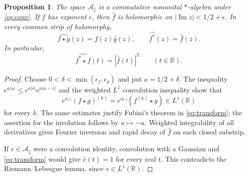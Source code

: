 \documentclass[11pt]{article}
\newtheorem{proposition}[theorem]{Proposition}
\theoremstyle{definition}
\theoremstyle{remark}
\numberwithin{equation}{section}
\newcommand{\cA}{\mathcal A}
\newcommand{\R}{\mathbb R}
\begin{document}
\begin{proposition}
The space $\cA_\zeta$ is a commutative nonunital $*$-algebra under
\eqref{eq:conv}.  If $f$ has exponent $\epsilon$, then $\widehat f$ is
holomorphic on $|\operatorname{Im}z|<1/2+\epsilon$.  In every common
strip of holomorphy,
\begin{equation}
 \widehat{f\star g}(z)=\widehat f(z)\widehat g(z),
 \qquad
 \widehat{f^*}(z)=\overline{\widehat f(\overline z)}.
 \label{eq:transform}
\end{equation}
In particular,
\begin{equation}
 \widehat{f^*\star f}(t)=|\widehat f(t)|^2
 \qquad(t\in\R).
 \label{eq:square-transform}
\end{equation}
\end{proposition}

\begin{proof}
Choose $0<\delta<\min(\epsilon_f,\epsilon_g)$ and put
$a=1/2+\delta$.  The inequality
$e^{a|u|}\leq e^{a|v|}e^{a|u-v|}$ and the weighted $L^1$ convolution
inequality show that
\[
 e^{a|\cdot|}(f\star g)^{(k)}
 =e^{a|\cdot|}(f^{(k)}\star g)\in L^1(\R)
\]
for every $k$.  The same estimates justify Fubini's theorem in
\eqref{eq:transform}; the assertion for the involution follows by
$u\mapsto-u$.  Weighted integrability of all derivatives gives Fourier
inversion and rapid decay of $\widehat f$ on each closed substrip.

If $e\in\cA_\zeta$ were a convolution identity, convolution with a
Gaussian and \eqref{eq:transform} would give $\widehat e(t)=1$ for every
real $t$.  This contradicts the Riemann--Lebesgue lemma, since
$e\in L^1(\R)$.
\end{proof}
\end{document}
